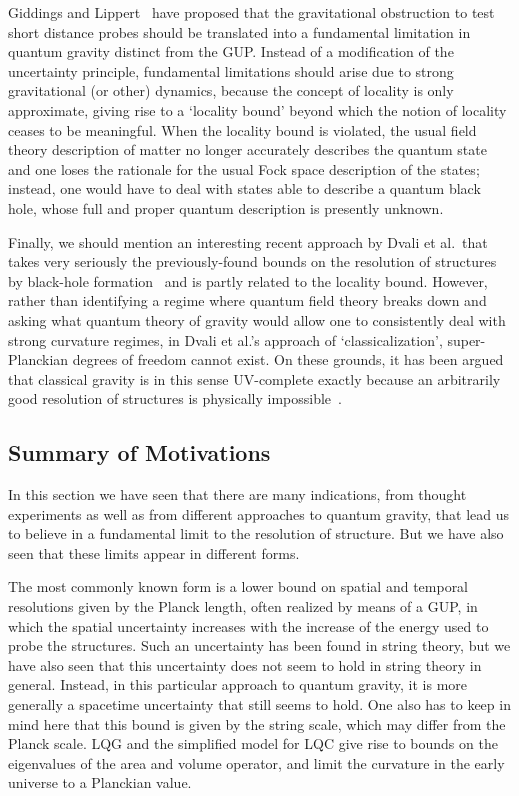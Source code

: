 \documentclass{article}
\begin{document}
Giddings and Lippert~\cite{Giddings:2001pt,Giddings:2004ud,Giddings:2006vu} have proposed that the gravitational obstruction to test 
short distance probes should be translated into a fundamental limitation in quantum gravity distinct from the GUP.
Instead of a modification of the uncertainty principle, fundamental limitations should arise due to strong gravitational (or other) dynamics,
 because the concept of locality is only approximate, giving rise to a  `locality bound' beyond which the notion of locality ceases to be meaningful. 
When the locality bound is violated, the usual
 field theory description of matter no longer accurately describes the quantum state and one loses the rationale for the usual Fock space description 
of the states; instead, one would have to deal with states able to describe a quantum black hole, whose full and proper quantum description is presently
unknown.

Finally, we should mention an interesting recent approach by Dvali et al.\ that takes very seriously the
previously-found bounds on the resolution of structures by black-hole formation~\cite{Dvali:2010bf} and is partly
related to the locality bound. However, rather than identifying a regime where quantum field theory breaks
down and asking what quantum theory of gravity would 
allow one to consistently deal with
strong curvature regimes, in Dvali et al.'s approach of `classicalization', super-Planckian degrees of freedom cannot 
exist. On these grounds, it has been argued that classical gravity is in this sense UV-complete exactly because an arbitrarily
good resolution of structures is physically
impossible~\cite{Dvali:2010ue}.


\subsection{Summary of Motivations}

In this section we have seen that there are many indications, from thought experiments as well
as from different approaches to quantum gravity, that lead us to believe in a fundamental limit to
the resolution of structure. But we have also seen that these limits appear in different forms. 

The most commonly known form is a lower bound on spatial and temporal resolutions given by the Planck
length, often realized by means of a GUP, in which the spatial
uncertainty increases with the increase of the energy used to probe the structures. Such an uncertainty
has been found in string theory, but we have also seen that this uncertainty does not seem to
hold in string theory in general. Instead, in this particular approach to quantum gravity, it is more
generally a 
spacetime uncertainty that 
still seems to hold. One also has to keep in mind here that this bound is given by the string scale, which
may differ from the Planck scale. LQG and the simplified model for LQC give rise to bounds on the eigenvalues of the area and volume operator, and limit
the curvature in the early universe to a Planckian value. 
\end{document}
